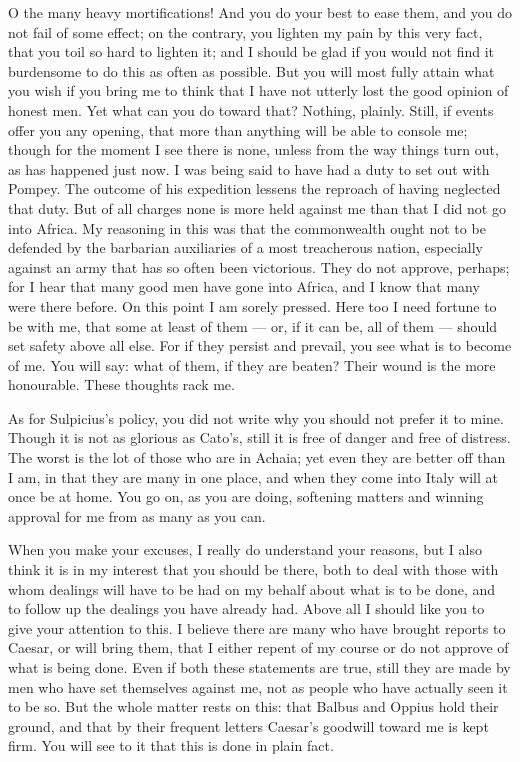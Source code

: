  O the many heavy mortifications! And you do your best to ease them, and you do not fail of some effect; on the contrary, you lighten my pain by this very fact, that you toil so hard to lighten it; and I should be glad if you would not find it burdensome to do this as often as possible. But you will most fully attain what you wish if you bring me to think that I have not utterly lost the good opinion of honest men. Yet what can you do toward that? Nothing, plainly. Still, if events offer you any opening, that more than anything will be able to console me; though for the moment I see there is none, unless from the way things turn out, as has happened just now. I was being said to have had a duty to set out with Pompey. The outcome of his expedition lessens the reproach of having neglected that duty. But of all charges none is more held against me than that I did not go into Africa. My reasoning in this was that the commonwealth ought not to be defended by the barbarian auxiliaries of a most treacherous nation, especially against an army that has so often been victorious. They do not approve, perhaps; for I hear that many good men have gone into Africa, and I know that many were there before. On this point I am sorely pressed. Here too I need fortune to be with me, that some at least of them --- or, if it can be, all of them --- should set safety above all else. For if they persist and prevail, you see what is to become of me. You will say: what of them, if they are beaten? Their wound is the more honourable. These thoughts rack me.

 As for Sulpicius's policy, you did not write why you should not prefer it to mine. Though it is not as glorious as Cato's, still it is free of danger and free of distress. The worst is the lot of those who are in Achaia; yet even they are better off than I am, in that they are many in one place, and when they come into Italy will at once be at home. You go on, as you are doing, softening matters and winning approval for me from as many as you can.

 When you make your excuses, I really do understand your reasons, but I also think it is in my interest that you should be there, both to deal with those with whom dealings will have to be had on my behalf about what is to be done, and to follow up the dealings you have already had. Above all I should like you to give your attention to this. I believe there are many who have brought reports to Caesar, or will bring them, that I either repent of my course or do not approve of what is being done. Even if both these statements are true, still they are made by men who have set themselves against me, not as people who have actually seen it to be so. But the whole matter rests on this: that Balbus and Oppius hold their ground, and that by their frequent letters Caesar's goodwill toward me is kept firm. You will see to it that this is done in plain fact.

